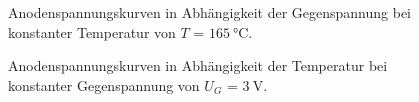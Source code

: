 \begin{figure}[!ht]
    \medskip

  \caption{Anodenspannungskurven in Abhängigkeit der Gegenspannung bei konstanter Temperatur von $T$ = $\SI{165}{\celsius}$.}
    \label{fig:UGall}
\end{figure}

\begin{figure}[!ht]
    \centering
  
    \medskip

  \caption{Anodenspannungskurven in Abhängigkeit der Temperatur bei konstanter Gegenspannung von $U_G$ = $\SI{3}{\volt}$.}
    \label{fig:Tall}
\end{figure}


